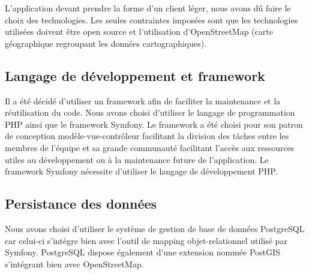 

L'application devant prendre la forme d'un client léger, nous avons dû faire le choix des technologies. Les seules contraintes imposées sont que les technologies utilisées doivent être open source et l'utilisation d'OpenStreetMap (carte géographique regroupant les données cartographiques).

\subsection{Langage de développement et framework}
Il a été décidé d'utiliser un framework afin de faciliter la maintenance et la réutilisation du code.
Nous avons choisi d'utiliser le langage de programmation PHP ainsi que le framework Symfony. Le framework a été choisi pour son patron de conception modèle-vue-contrôleur facilitant la division des tâches entre les membres de l'équipe et sa grande communauté facilitant l'accès aux ressources utiles au développement ou à la maintenance future de l'application.
Le framework Symfony nécessite d'utiliser le langage de développement PHP. 

\subsection{Persistance des données}
Nous avons choisi d'utiliser le système de gestion de base de données PostgreSQL car celui-ci s'intègre bien avec l'outil de mapping objet-relationnel utilisé par Symfony. PostgreSQL dispose également d'une extension nommée PostGIS s'intégrant bien avec OpenStreetMap.